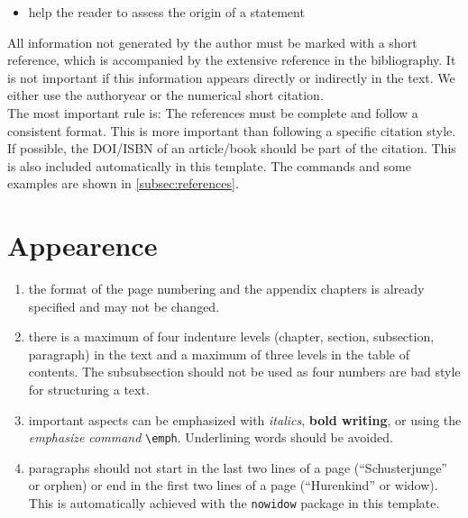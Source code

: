 \begin{enumerate}
\begin{itemize}
		      \item help the reader to assess the origin of a statement
	      \end{itemize}
	      All information not generated by the author must be marked with a short reference, which is accompanied by the extensive reference in the bibliography. It is not important if this information appears directly or indirectly in the text. We either use the authoryear or the numerical short citation. \\
	      The most important rule is: The references must be complete and follow a consistent format. This is more important than following a specific citation style. If possible, the DOI/ISBN of an article/book should be part of the citation. This is also included automatically in this template. The commands and some examples are shown in \autoref{subsec:references}.
\end{enumerate}
\section{Appearence}
\begin{enumerate}
	\item the format of the page numbering and the appendix chapters is already specified and may not be changed.
	\item there is a maximum of four indenture levels (chapter, section, subsection, paragraph) in the text and a maximum of three levels in the table of contents. The subsubsection should not be used as four numbers are bad style for structuring a text.
	\item important aspects can be emphasized with \textit{italics}, \textbf{bold writing}, or using the \emph{emphasize command} \verb+\emph+. Underlining words should be avoided.
	\item paragraphs should not start in the last two lines of a page (\enquote{Schusterjunge} or orphen) or end in the first two lines of a page (\enquote{Hurenkind} or widow). This is automatically achieved with the \verb+nowidow+ package in this template.
\end{enumerate}
